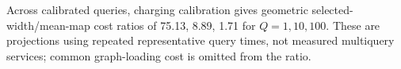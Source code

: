 Across calibrated queries, charging calibration gives geometric selected-width/mean-map cost ratios of 75.13, 8.89, 1.71 for $Q=1,10,100$. These are projections using repeated representative query times, not measured multiquery services; common graph-loading cost is omitted from the ratio.
